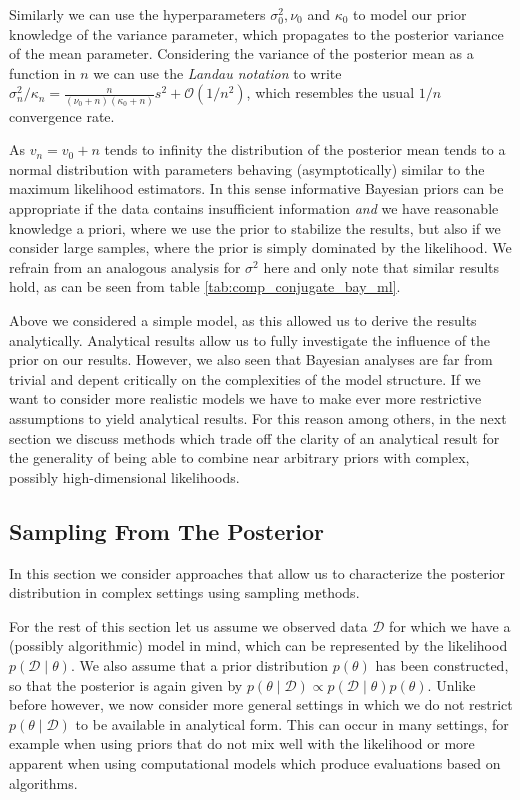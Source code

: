 Similarly we can use the hyperparameters $\sigma_0^2, \nu_0$ and $\kappa_0$ to model our prior knowledge of the variance parameter, which propagates to the posterior variance of the mean parameter.
Considering the variance of the posterior mean as a function in $n$ we can use the \emph{Landau notation} to write $\sigma_n^2 / \kappa_n =  \frac{n}{(\nu_0 + n)(\kappa_0 + n)} s^2 + \mathcal{O}(1/n^2)$, which resembles the usual $1/n$ convergence rate.

As $v_n = v_0 + n$ tends to infinity the distribution of the posterior mean tends to a normal distribution with parameters behaving (asymptotically) similar to the maximum likelihood estimators.
In this sense informative Bayesian priors can be appropriate if the data contains insufficient information \emph{and} we have reasonable knowledge a priori, where we use the prior to stabilize the results, but also if we consider large samples, where the prior is simply dominated by the likelihood.
We refrain from an analogous analysis for $\sigma^2$ here and only note that similar results hold, as can be seen from table \ref{tab:comp_conjugate_bay_ml}.

Above we considered a simple model, as this allowed us to derive the results analytically.
Analytical results allow us to fully investigate the influence of the prior on our results.
However, we also seen that Bayesian analyses are far from trivial and depent critically on the complexities of the model structure.
If we want to consider more realistic models we have to make ever more restrictive assumptions to yield analytical results.
For this reason among others, in the next section we discuss methods which trade off the clarity of an analytical result for the generality of being able to combine near arbitrary priors with complex, possibly high-dimensional likelihoods.

\subsection{Sampling From The Posterior}
In this section we consider approaches that allow us to characterize the posterior distribution in complex settings using sampling methods.

For the rest of this section let us assume we observed data $\mathcal{D}$ for which we have a (possibly algorithmic) model in mind, which can be represented by the likelihood $p(\mathcal{D} \mid \theta)$.
We also assume that a prior distribution $p(\theta)$ has been constructed, so that the posterior is again given by $p(\theta \mid \mathcal{D}) \propto p(\mathcal{D} \mid \theta) p(\theta)$.
Unlike before however, we now consider more general settings in which we do not restrict $p(\theta \mid \mathcal{D})$ to be available in analytical form.
This can occur in many settings, for example when using priors that do not mix well with the likelihood or more apparent when using computational models which produce evaluations based on algorithms.

